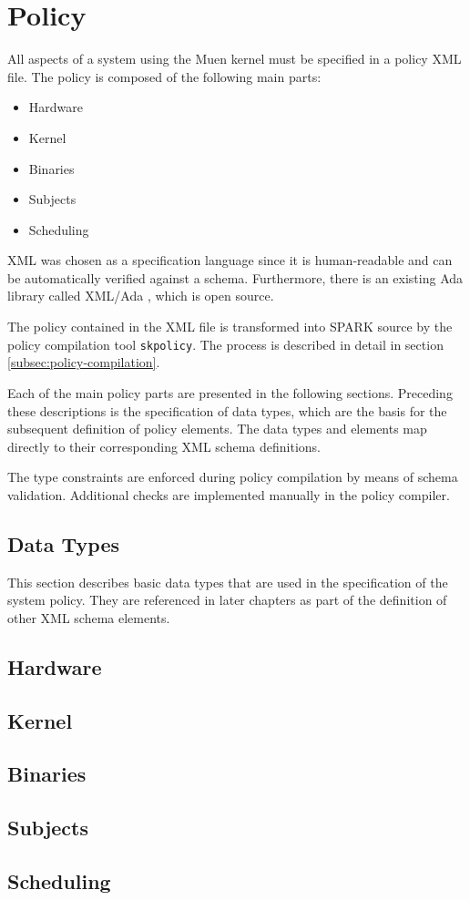 \section{Policy}\label{sec:policy}
All aspects of a system using the Muen kernel must be specified in a policy XML
file. The policy is composed of the following main parts:

\begin{itemize}
	\item Hardware
	\item Kernel
	\item Binaries
	\item Subjects
	\item Scheduling
\end{itemize}

XML was chosen as a specification language since it is human-readable and can
be automatically verified against a schema. Furthermore, there is an existing
Ada library called XML/Ada \cite{xmlada}, which is open source.

The policy contained in the XML file is transformed into SPARK source by the
policy compilation tool \texttt{skpolicy}. The process is described in detail in
section \ref{subsec:policy-compilation}.

Each of the main policy parts are presented in the following sections. Preceding
these descriptions is the specification of data types, which are the basis for
the subsequent definition of policy elements. The data types and elements map
directly to their corresponding XML schema definitions.

The type constraints are enforced during policy compilation by means of schema
validation. Additional checks are implemented manually in the policy compiler.

\subsection{Data Types}
This section describes basic data types that are used in the specification of
the system policy. They are referenced in later chapters as part of the
definition of other XML schema elements.



\subsection{Hardware}\label{subsec:hardware}


\subsection{Kernel}


\subsection{Binaries}


\clearpage
\subsection{Subjects}\label{subsec:subjects}


\subsection{Scheduling}

